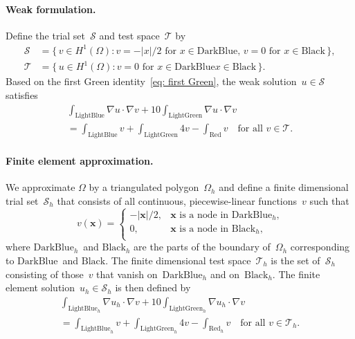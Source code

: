 \documentclass[a4paper,12pt]{article}
\begin{document}
\paragraph{Weak formulation.}
Define the trial set~$\mathcal{S}$ and test space~$\mathcal{T}$ by
\begin{align*}
\mathcal{S}&=\{\,v\in H^1(\Omega):
\text{$v=-|x|/2$ for $x\in\text{DarkBlue}$, $v=0$ for 
$x\in\text{Black}$}\,\},\\
\mathcal{T}&=\{\,u\in H^1(\Omega):
\text{$v=0$ for $x\in\text{DarkBlue}$
$x\in\text{Black}$}\,\}.
\end{align*}
Based on the first Green identity~\eqref{eq: first Green}, the weak 
solution~$u\in\mathcal{S}$ satisfies
\begin{multline*}
\int_{\text{LightBlue}}\nabla u\cdot\nabla v
	+10\int_{\text{LightGreen}}\nabla u\cdot\nabla v\\
	=\int_{\text{LightBlue}}v+\int_{\text{LightGreen}}4v
	-\int_{\text{Red}}v
\quad\text{for all $v\in\mathcal{T}$.}
\end{multline*}

\paragraph{Finite element approximation.} 
We approximate $\Omega$ by a triangulated polygon~$\Omega_h$ and 
define a finite dimensional trial set~$\mathcal{S}_h$ that consists 
of all continuous, piecewise-linear functions~$v$ such that 
\[
v(\boldsymbol{x})=\begin{cases}
-|\boldsymbol{x}|/2,&
\text{$\boldsymbol{x}$ is a node in~$\text{DarkBlue}_h$,}\\
0,&\text{$\boldsymbol{x}$ is a node in~$\text{Black}_h$,}\\
\end{cases}
\]
where $\text{DarkBlue}_h$~and $\text{Black}_h$ are the parts
of the boundary of~$\Omega_h$ corresponding to $\text{DarkBlue}$~and 
$\text{Black}$.  The finite dimensional test 
space~$\mathcal{T}_h$ is the set of~$\mathcal{S}_h$ consisting of 
those~$v$ that vanish on~$\text{DarkBlue}_h$ and
on~$\text{Black}_h$.  The finite element 
solution~$u_h\in\mathcal{S}_h$ is then defined by
\begin{multline*}
\int_{\text{LightBlue}_h}\nabla u_h\cdot\nabla v
	+10\int_{\text{LightGreen}_h}\nabla u_h\cdot\nabla v\\
	=\int_{\text{LightBlue}_h}v+\int_{\text{LightGreen}_h}4v
	-\int_{\text{Red}_h}v
\quad\text{for all $v\in\mathcal{T}_h$.}
\end{multline*}
\end{document}
